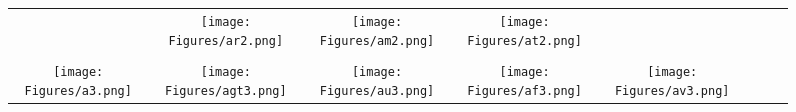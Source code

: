 \documentclass[journal]{IEEEtran}
\begin{document}
\begin{figure*}[!t]
\begin{tabular}{cccccccc}
		&
		\hspace{0.4cm}
		\begin{minipage}{30pt}
			\texttt{[image: Figures/ar2.png]}
\end{minipage}
		&
		\hspace{0.4cm}
		\begin{minipage}{30pt}
			\texttt{[image: Figures/am2.png]}
\end{minipage}
		&
		\hspace{0.4cm}
		\begin{minipage}{30pt}
			\texttt{[image: Figures/at2.png]}
\end{minipage}
		\\
		\\
		\begin{minipage}{30pt}
			\texttt{[image: Figures/a3.png]}
\end{minipage}
		&
		\hspace{0.4cm}
		\begin{minipage}{30pt}
			\texttt{[image: Figures/agt3.png]}
\end{minipage}
		&
		\hspace{0.4cm}
		\begin{minipage}{30pt}
			\texttt{[image: Figures/au3.png]}
\end{minipage}
		&
		\hspace{0.4cm}
		\begin{minipage}{30pt}
			\texttt{[image: Figures/af3.png]}
\end{minipage}
		&
		\hspace{0.4cm}
		\begin{minipage}{30pt}
			\texttt{[image: Figures/av3.png]}
\end{minipage}
		&
		

\end{tabular}
\end{figure*}
\end{document}
